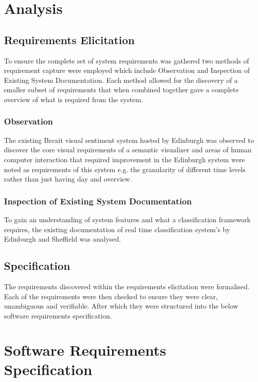 \documentclass[11pt]{report}
\begin{document}
\chapter{Analysis}

\section{Requirements Elicitation}
To ensure the complete set of system requirements was gathered two methods of requirement capture were employed which include Observation and Inspection of Existing System Documentation. Each method allowed for the discovery of a smaller subset of requirements that when combined together gave a complete overview of what is required from the system.

\subsection*{Observation}
The existing Brexit visual sentiment system hosted by Edinburgh \citep{llewellyn_brexit?_2016} was observed to discover the core visual requirements of a semantic visualizer and areas of human computer interaction that required improvement in the Edinburgh system were noted as requirements of this system e.g. the granularity of different time levels rather than just having day and overview. 

\subsection*{Inspection of Existing System Documentation}
To gain an understanding of system features and what a classification framework requires, the existing documentation of real time classification system's by Edinburgh \citep{llewellyn_brexit?_2016} and Sheffield \citep{maynard_framework_2017} was analysed.

\section{Specification}
The requirements discovered within the requirements elicitation were formalised. Each of the requirements were then checked to ensure they were clear, unambiguous and verifiable. After which they were structured into the below software requirements specification.

\chapter*{Software Requirements Specification}
\end{document}
